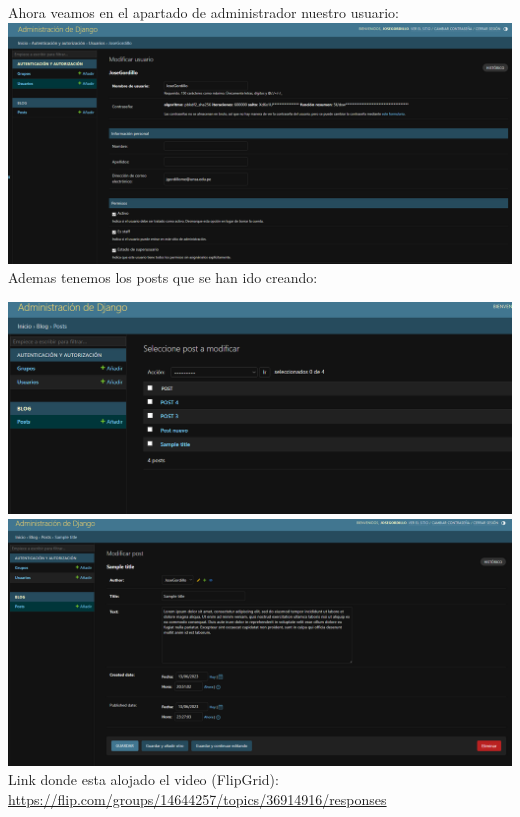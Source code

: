 \documentclass{article}
\begin{document}
        \newline\newline\newline
        Ahora veamos en el apartado de administrador nuestro usuario:
        \newline\newline
        \includegraphics[width=16cm]{img/USUARIO.png}
        Ademas tenemos los posts que se han ido creando:\newline
    
        \includegraphics[width=16cm]{img/LISTADOposts.png}
        \newline\newline
        \includegraphics[width=16cm]{img/POSTejemplo.png}
        \newline
        Link donde esta alojado el video (FlipGrid): \url{https://flip.com/groups/14644257/topics/36914916/responses}
        
\end{document}
